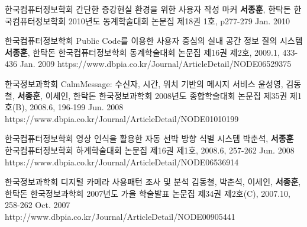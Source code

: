 \begin{cventries}
  \cvpublicationentry
    {한국컴퓨터정보학회} %
    {간단한 증강현실 환경을 위한 사용자 작성 마커} %
    {\textbf{서종훈}, 한탁돈} %
    {한국컴퓨터정보학회 2010년도 동계학술대회 논문집 제18권 1호, p277-279}
    {Jan. 2010} %
    {}

  \cvpublicationentry
    {한국컴퓨터정보학회} %
    {Public Code를 이용한 사용자 중심의 실내 공간 정보 질의 시스템} %
    {\textbf{서종훈}, 한탁돈} %
    {한국컴퓨터정보학회 동계학술대회 논문집 제16권 제2호, 2009.1, 433-436}
    {Jan. 2009} %
    {https://www.dbpia.co.kr/Journal/ArticleDetail/NODE06529375}

  \cvpublicationentry
    {한국정보과학회} %
    {CalmMessage: 수신자, 시간, 위치 기반의 메시지 서비스} %
    {윤성영, 김동철, \textbf{서종훈}, 이세인, 한탁돈} %
    {한국정보과학회 2008년도 종합학술대회 논문집 제35권 제1호(B), 2008.6, 196-199}
    {Jun. 2008} %
    {https://www.dbpia.co.kr/Journal/ArticleDetail/NODE01010199}

  \cvpublicationentry
    {한국컴퓨터정보학회} %
    {영상 인식을 활용한 자동 선박 방향 식별 시스템} %
    {박춘석, \textbf{서종훈}} %
    {한국컴퓨터정보학회 하계학술대회 논문집 제16권 제1호, 2008.6, 257-262}
    {Jun. 2008} %
    {https://www.dbpia.co.kr/Journal/ArticleDetail/NODE06536914}

  \cvpublicationentry
    {한국정보과학회} %
    {디지털 카메라 사용패턴 조사 및 분석} %
    {김동철, 박춘석, 이세인, \textbf{서종훈}, 한탁돈} %
    {한국정보과학회 2007년도 가을 학술발표 논문집 제34권 제2호(C), 2007.10, 258-262}
    {Oct. 2007} %
    {http://www.dbpia.co.kr/Journal/ArticleDetail/NODE00905441}


\end{cventries}
